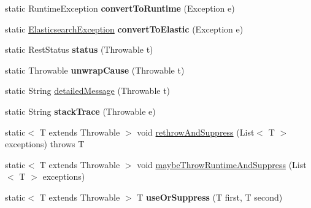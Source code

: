 \begin{DoxyCompactItemize}
\item 
\hypertarget{classorg_1_1elasticsearch_1_1_exceptions_helper_a58745605e2183728adcff0abba44738a}{}\label{classorg_1_1elasticsearch_1_1_exceptions_helper_a58745605e2183728adcff0abba44738a} 
static Runtime\+Exception {\bfseries convert\+To\+Runtime} (Exception e)
\item 
\hypertarget{classorg_1_1elasticsearch_1_1_exceptions_helper_a43f15321c7ff3620b362ababe8cf72c1}{}\label{classorg_1_1elasticsearch_1_1_exceptions_helper_a43f15321c7ff3620b362ababe8cf72c1} 
static \hyperlink{classorg_1_1elasticsearch_1_1_elasticsearch_exception}{Elasticsearch\+Exception} {\bfseries convert\+To\+Elastic} (Exception e)
\item 
\hypertarget{classorg_1_1elasticsearch_1_1_exceptions_helper_a867a606fb84e5669c66cd711e154ba01}{}\label{classorg_1_1elasticsearch_1_1_exceptions_helper_a867a606fb84e5669c66cd711e154ba01} 
static Rest\+Status {\bfseries status} (Throwable t)
\item 
\hypertarget{classorg_1_1elasticsearch_1_1_exceptions_helper_afe1e41350ff55d0a8c355fed092c8843}{}\label{classorg_1_1elasticsearch_1_1_exceptions_helper_afe1e41350ff55d0a8c355fed092c8843} 
static Throwable {\bfseries unwrap\+Cause} (Throwable t)
\item 
static String \hyperlink{classorg_1_1elasticsearch_1_1_exceptions_helper_a9ceadc9e3e73578bcf5ad6f14c91e6ff}{detailed\+Message} (Throwable t)
\item 
\hypertarget{classorg_1_1elasticsearch_1_1_exceptions_helper_a4b9859fad06d47581efc1449725e077c}{}\label{classorg_1_1elasticsearch_1_1_exceptions_helper_a4b9859fad06d47581efc1449725e077c} 
static String {\bfseries stack\+Trace} (Throwable e)
\item 
static$<$ T extends Throwable $>$ void \hyperlink{classorg_1_1elasticsearch_1_1_exceptions_helper_acf6601d79d7aaa8791ecc8847a480e4f}{rethrow\+And\+Suppress} (List$<$ T $>$ exceptions)  throws T 
\item 
static$<$ T extends Throwable $>$ void \hyperlink{classorg_1_1elasticsearch_1_1_exceptions_helper_ad3418e31f771224486cce3bb9c1992ff}{maybe\+Throw\+Runtime\+And\+Suppress} (List$<$ T $>$ exceptions)
\item 
\hypertarget{classorg_1_1elasticsearch_1_1_exceptions_helper_a621ce635df11ba76b4aea1685dcb31a1}{}\label{classorg_1_1elasticsearch_1_1_exceptions_helper_a621ce635df11ba76b4aea1685dcb31a1} 
static$<$ T extends Throwable $>$ T {\bfseries use\+Or\+Suppress} (T first, T second)

\end{DoxyCompactItemize}
